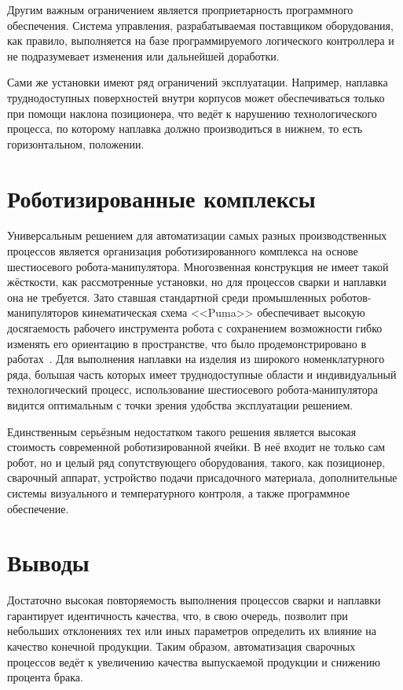 Другим важным ограничением является проприетарность программного обеспечения.
Система управления, разрабатываемая поставщиком оборудования, как правило, выполняется на базе программируемого логического контроллера и не подразумевает изменения или дальнейшей доработки.

Сами же установки имеют ряд ограничений эксплуатации.
Например, наплавка труднодоступных поверхностей внутри корпусов может обеспечиваться только при помощи наклона позиционера, что ведёт к нарушению технологического процесса, по которому наплавка должно производиться в нижнем, то есть горизонтальном, положении.


\section{Роботизированные комплексы}
Универсальным решением для автоматизации самых разных производственных процессов является организация роботизированного комплекса на основе шестиосевого робота-манипулятора.
Многозвенная конструкция не имеет такой жёсткости, как рассмотренные установки, но для процессов сварки и наплавки она не требуется.
Зато ставшая стандартной среди промышленных роботов-манипуляторов кинематическая схема <<Puma>> обеспечивает высокую досягаемость рабочего инструмента робота с сохранением возможности гибко изменять его ориентацию в пространстве, что было продемонстрировано в работах~\cite{Fan_Tien_Cheng_1997,Gupta_1990,Mei_2019}.
Для выполнения наплавки на изделия из широкого номенклатурного ряда, большая часть которых имеет труднодоступные области и индивидуальный технологический процесс, использование шестиосевого робота-манипулятора видится оптимальным с точки зрения удобства эксплуатации решением.

Единственным серьёзным недостатком такого решения является высокая стоимость современной роботизированной ячейки.
В неё входит не только сам робот, но и целый ряд сопутствующего оборудования, такого, как позиционер, сварочный аппарат, устройство подачи присадочного материала, дополнительные системы визуального и температурного контроля, а также программное обеспечение.


\section{Выводы}
Достаточно высокая повторяемость выполнения процессов сварки и наплавки гарантирует идентичность качества, что, в свою очередь, позволит при небольших отклонениях тех или иных параметров определить их влияние на качество конечной продукции.
Таким образом, автоматизация сварочных процессов ведёт к увеличению качества выпускаемой продукции и снижению процента брака.

